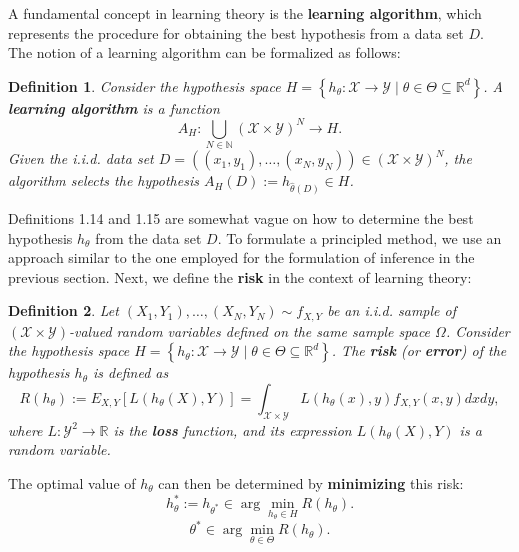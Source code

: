 \documentclass{report}
\newtheorem{definition}{Definition}[chapter]
\begin{document}
A fundamental concept in learning theory is the \textbf{learning algorithm}, which represents the procedure for obtaining the best hypothesis from a data set $D$. The notion of a learning algorithm can be formalized as follows:

\begin{definition}
Consider the hypothesis space $H = \left\{h_\theta : \mathcal{X} \to \mathcal{Y} \mid\theta\in\Theta\subseteq\mathbb{R}^d\right\}$. A \textbf{learning algorithm} is a function
\[ A_H : \bigcup_{N \in \mathbb{N}} (\mathcal{X}\times \mathcal{Y}) ^N\to H.\]
Given the  i.i.d. data set $D = ((x_1,y_1), \dots, (x_N,y_N)) \in (\mathcal{X} \times \mathcal{Y})^N$, the algorithm selects the hypothesis $A_H(D) := h_{\hat{\theta}(D)} \in H$.
\end{definition}

Definitions 1.14 and 1.15 are somewhat vague on how to determine the best hypothesis $h_\theta$ from the data set $D$. To formulate a principled method, we use an approach similar to the one employed for the formulation of inference in the previous section. Next, we define the \textbf{risk} in the context of learning theory:

\begin{definition}
Let $(X_1, Y_1),\dots,(X_N, Y_N) \sim f_{X,Y}$ be an i.i.d. sample of $(\mathcal{X} \times \mathcal{Y})$-valued random variables defined on the same sample space $\Omega$. Consider the hypothesis space $H = \left\{h_\theta : \mathcal{X} \to \mathcal{Y} \mid\theta\in\Theta\subseteq\mathbb{R}^d\right\}$. The \textbf{risk} (or \textbf{error}) of the hypothesis $h_\theta$ is defined as
\begin{equation}
R(h_\theta) := E_{X,Y}[L(h_\theta(X),Y)] = \int_{\mathcal{X} \times \mathcal{Y}} L(h_\theta(x),y)f_{X,Y}(x,y)dxdy,
\end{equation}
where $L :\mathcal{Y}^2 \to \mathbb{R}$ is the \textbf{loss} function, and its expression $L(h_\theta(X), Y)$ is a random variable.
\end{definition}

The optimal value of $h_\theta$ can then be determined by \textbf{minimizing} this risk:
\begin{equation}
h_\theta^* := h_{\theta^*} \in \arg \min_{h_\theta \in H} R(h_\theta).
\end{equation}
\begin{equation}
\theta^* \in \arg \min_{\theta \in \Theta} R(h_\theta).
\end{equation}
\end{document}
